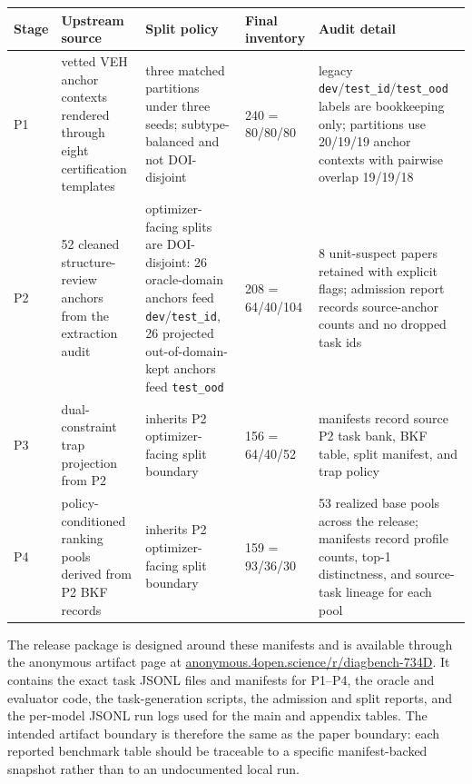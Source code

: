 \begin{center}
\label{tab:appendix_construction_audit}
\centering
\scriptsize
\setlength{\tabcolsep}{3pt}
\renewcommand{\arraystretch}{1.08}
\begin{tabularx}{\textwidth}{p{17mm}p{24mm}p{27mm}p{18mm}Y}
\toprule
Stage & Upstream source & Split policy & Final inventory & Audit detail \\
\midrule
P1 & vetted VEH anchor contexts rendered through eight certification templates & three matched partitions under three seeds; subtype-balanced and not DOI-disjoint & 240 = 80/80/80 & legacy \texttt{dev}/\texttt{test\_id}/\texttt{test\_ood} labels are bookkeeping only; partitions use 20/19/19 anchor contexts with pairwise overlap 19/19/18 \\
P2 & 52 cleaned structure-review anchors from the extraction audit & optimizer-facing splits are DOI-disjoint: 26 oracle-domain anchors feed \texttt{dev}/\texttt{test\_id}, 26 projected out-of-domain-kept anchors feed \texttt{test\_ood} & 208 = 64/40/104 & 8 unit-suspect papers retained with explicit flags; admission report records source-anchor counts and no dropped task ids \\
P3 & dual-constraint trap projection from P2 & inherits P2 optimizer-facing split boundary & 156 = 64/40/52 & manifests record source P2 task bank, BKF table, split manifest, and trap policy \\
P4 & policy-conditioned ranking pools derived from P2 BKF records & inherits P2 optimizer-facing split boundary & 159 = 93/36/30 & 53 realized base pools across the release; manifests record profile counts, top-1 distinctness, and source-task lineage for each pool \\
\bottomrule
\end{tabularx}
\end{center}

The release package is designed around these manifests and is available through the anonymous artifact page at \href{https://anonymous.4open.science/r/diagbench-734D/README.md}{anonymous.4open.science/r/diagbench-734D}. It contains the exact task JSONL files and manifests for P1--P4, the oracle and evaluator code, the task-generation scripts, the admission and split reports, and the per-model JSONL run logs used for the main and appendix tables. The intended artifact boundary is therefore the same as the paper boundary: each reported benchmark table should be traceable to a specific manifest-backed snapshot rather than to an undocumented local run.


